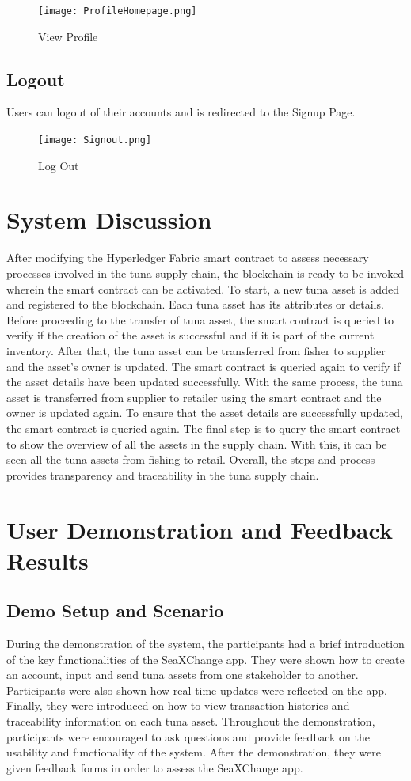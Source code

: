 \begin{figure}[H]
	\centering
	\texttt{[image: ProfileHomepage.png]}
	\caption{View Profile}
	\label{fig:view_profile}
\end{figure}

\subsection{Logout}
Users can logout of their accounts and is redirected to the Signup Page.

\begin{figure}[H]
	\centering
	\texttt{[image: Signout.png]}
	\caption{Log Out}
	\label{fig:signout}
\end{figure} 

\section{System Discussion}
After modifying the Hyperledger Fabric smart contract to assess necessary processes involved in the tuna supply chain, the blockchain is ready to be invoked wherein the smart contract can be activated. To start, a new tuna asset is added and registered to the blockchain. Each tuna asset has its attributes or details. Before proceeding to the transfer of tuna asset, the smart contract is queried to verify if the creation of the asset is successful and if it is part of the current inventory. After that, the tuna asset can be transferred from fisher to supplier and the asset's owner is updated. The smart contract is queried again to verify if the asset details have been updated successfully. With the same process, the tuna asset is transferred from supplier to retailer using the smart contract and the owner is updated again. To ensure that the asset details are successfully updated, the smart contract is queried again. The final step is to query the smart contract to show the overview of all the assets in the supply chain. With this, it can be seen all the tuna assets from fishing to retail. Overall, the steps and process provides transparency and traceability in the tuna supply chain.

\section{User Demonstration and Feedback Results}
\subsection{Demo Setup and Scenario}
During the demonstration of the system, the participants had a brief introduction of the key functionalities of the SeaXChange app. They were shown how to create an account, input and send tuna assets from one stakeholder to another. Participants were also shown how real-time updates were reflected on the app. Finally, they were introduced on how to view transaction histories and traceability information on each tuna asset. Throughout the demonstration, participants were encouraged to ask questions and provide feedback on the usability and functionality of the system. After the demonstration, they were given feedback forms in order to assess the SeaXChange app. 

